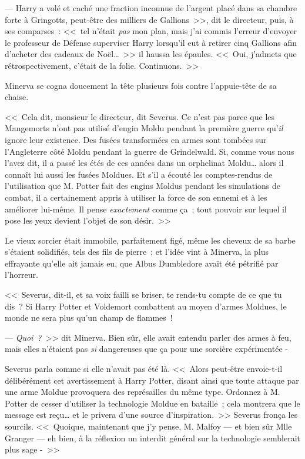 --- Harry a volé et caché une fraction inconnue de l'argent placé dans sa chambre forte à Gringotts, peut-être des milliers de Gallions~>>, dit le directeur, puis, à ses comparses~: <<~tel n'était \emph{pas} mon plan, mais j'ai commis l'erreur d'envoyer le professeur de Défense superviser Harry lorsqu'il eut à retirer cinq Gallions afin d'acheter des cadeaux de Noël…~>> il haussa les épaules. <<~Oui, j'admets que rétrospectivement, c'était de la folie. Continuons.~>>

Minerva se cogna doucement la tête plusieurs fois contre l'appuie-tête de sa chaise.

<<~Cela dit, monsieur le directeur, dit Severus. Ce n'est pas parce que les Mangemorts n'ont pas utilisé d'engin Moldu pendant la première guerre qu'\emph{il} ignore leur existence. Des fusées transformées en armes sont tombées sur l'Angleterre côté Moldu pendant la guerre de Grindelwald. Si, comme vous nous l'avez dit, il a passé les étés de ces années dans un orphelinat Moldu… alors il connaît lui aussi les fusées Moldues. Et s'il a écouté les comptes-rendus de l'utilisation que M. Potter fait des engins Moldus pendant les simulations de combat, il a certainement appris à utiliser la force de son ennemi et à les améliorer lui-même. Il pense \emph{exactement} comme ça~; tout pouvoir sur lequel il pose les yeux devient l'objet de son désir.~>>

Le vieux sorcier était immobile, parfaitement figé, même les cheveux de sa barbe s'étaient solidifiés, tels des fils de pierre~; et l'idée vint à Minerva, la plus effrayante qu'elle ait jamais eu, que Albus Dumbledore avait été pétrifié par l'horreur.

<<~Severus, dit-il, et sa voix failli se briser, te rends-tu compte de ce que tu dis~? Si Harry Potter et Voldemort combattent au moyen d'armes Moldues, le monde ne sera plus qu'un champ de flammes~!

--- \emph{Quoi~?}~>> dit Minerva. Bien sûr, elle avait entendu parler des armes à feu, mais elles n'étaient pas \emph{si} dangereuses que ça pour une sorcière expérimentée -

Severus parla comme si elle n'avait pas été là. <<~Alors peut-être envoie-t-il délibérément cet avertissement à Harry Potter, disant ainsi que toute attaque par une arme Moldue provoquera des représailles du même type. Ordonnez à M. Potter de cesser d'utiliser la technologie Moldue en bataille~; cela montrera que le message est reçu… et le privera d'une source d'inspiration.~>> Severus fronça les sourcils. <<~Quoique, maintenant que j'y pense, M. Malfoy — et bien sûr Mlle Granger — eh bien, à la réflexion un interdit général sur la technologie semblerait plus sage -~>>

